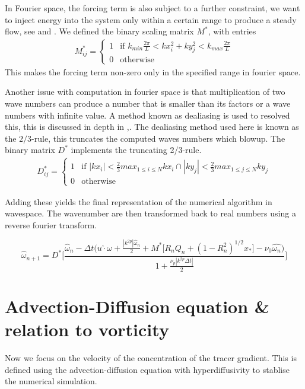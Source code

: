 In Fourier space, the forcing term is also subject to a further constraint, we want to inject energy into the system only within a certain range to produce a steady flow, see \cite{main} and \cite{lilly}. We defined the binary scaling matrix $M^{*}$, with entries
\begin{align*}
 M^{*}_{ij} = 
 \begin{cases}
    1 & \text{if $k_{min}\frac{2\pi}{L} < kx^{2}_{i} + ky^{2}_{j} < k_{max}\frac{2\pi}{L}$} \\
    0 & \text{otherwise} 
  \end{cases}
\end{align*}
This makes the forcing term non-zero only in the specified range in fourier space.

Another issue with computation in fourier space is that multiplication of two wave numbers can produce a number that is smaller than its factors or a wave numbers with infinite value. A method known as dealiasing is 
used to resolved this, this is discussed in depth in \cite{bowman},.
The dealiasing method used here is known as the $2/3$-rule, this truncates the computed waves numbers which blowup. The  binary matrix $D^{*}$ implements the truncating 2/3-rule. 
\begin{align*}
 D^{*}_{ij} = 
 \begin{cases}
    1 & \text{if $|kx_{i}| < \frac{2}{3}max_{1 \leq i \leq N}kx_{i} \cap |ky_{j}| < \frac{2}{3}max_{1 \leq j \leq N}ky_{j}$} \\
    0 & \text{otherwise} 
 \end{cases}
\end{align*}

Adding these yields the final representation of the numerical algorithm in wavespace. The wavenumber are then transformed back to real numbers using a reverse fourier transform.

\begin{equation}
\label{eqn:vort_mat_diff_eqn_fourier}
\hat{\omega}_{n+1} = D^{*} \Biggr[ \frac{\hat{\omega}_{n} - {\Delta t} \Bigg( u \hat{\cdot} \omega  + \frac{|k^{2p}| \hat{\omega}_{n}}{2} + M^{*}\bigg[R_{n}Q_{n} + (1 - R^{2}_{n})^{1/2}x_{*}\bigg] - \nu_{0} \hat{\omega_{n}} \Bigg)}{1 + \frac{\nu_{p}|k^{2p}\Delta t|}{2}} \Biggr]
\end{equation}



\section{Advection-Diffusion equation \& relation to vorticity} \label{sec:theory}
Now we focus on the velocity of the concentration of the tracer gradient. This is defined using the advection-diffusion equation with hyperdiffusivity to stablise the numerical simulation.

